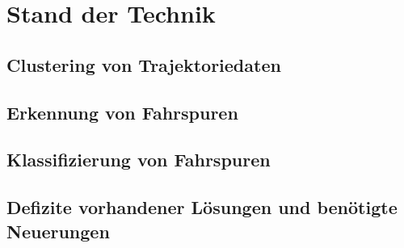 
\chapter{Stand der Technik}
\label{cha:related_work}

\section{Clustering von Trajektoriedaten}
\label{sec:rw_clustering}

\section{Erkennung von Fahrspuren}
\label{sec:rw_lane_detection}

\section{Klassifizierung von Fahrspuren}
\label{sec:rw_lane_classification}

\section{Defizite vorhandener Lösungen und benötigte Neuerungen}
\label{sec:rw_deficites}